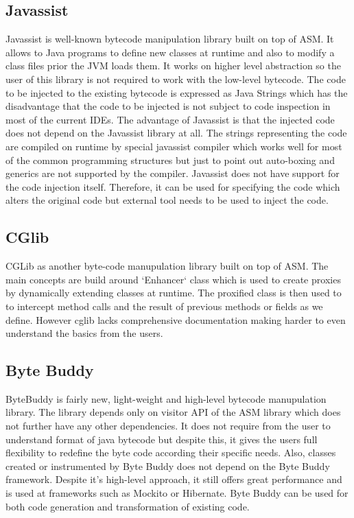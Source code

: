 \subsection{Javassist}
Javassist is well-known bytecode manipulation library built on top of ASM. It allows to Java programs to define new classes at runtime and also to modify a class files prior the JVM loads them. It works on higher level abstraction so the user of this library is not required to work with the low-level bytecode. The code to be injected to the existing bytecode is expressed as Java Strings which has the disadvantage that the code to be injected is not subject to code inspection in most of the current IDEs. The advantage of Javassist is that the injected code does not depend on the Javassist library at all. 
The strings representing the code are compiled on runtime by special javassist compiler which works well for most of the common programming structures but just to point out auto-boxing and generics are not supported by the compiler.
Javassist does not have support for the code injection itself. Therefore, it can be used for specifying the code which alters the original code but external tool needs to be used to inject the code.
\subsection{CGlib}
CGLib as another byte-code manupulation library built on top of ASM. The main concepts are build around `Enhancer` class which is used to create proxies by dynamically extending classes at runtime. The proxified class is then used to to intercept method calls and the result of previous methods or fields as we define. However cglib lacks comprehensive documentation making harder to even understand the basics from the users.

\subsection{Byte Buddy}
ByteBuddy is fairly new, light-weight and high-level bytecode manupulation library. The library depends only on visitor API of the ASM library which does not further have any other dependencies. It does not require from the user to understand format of java bytecode but despite this, it gives the users full flexibility to redefine the byte code according their specific needs. Also, classes created or instrumented by Byte Buddy does not depend on the Byte Buddy framework. Despite it's high-level approach, it still offers great performance and is used at frameworks such as Mockito or Hibernate. Byte Buddy can be used for both code generation and transformation of existing code.

